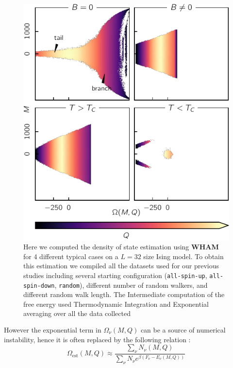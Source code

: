 \documentclass[ansiapaper]{report}
\begin{document}
\begin{multicols}{3}
\begin{figure}[H] 
    \begin{center}
        \hspace*{-.2cm}\includegraphics[width=1.05\linewidth]{figures/density_omega.pdf}
    \end{center}
    \caption{Here we computed the density of state estimation using \textbf{WHAM} for 4 different typical cases on a $L = 32$ size Ising model. To obtain this estimation we compiled all the datasets used for our previous studies including several starting configuration (\texttt{all-spin-up}, \texttt{all-spin-down}, \texttt{random}), different number of random walkers, and different random walk length. The Intermediate computation of the free energy used Thermodynamic Integration and Exponential averaging over all the data collected
    }
    \label{fig:density-states}
\end{figure}
However the exponential term in $\Omega_{\nu}(M,Q)$ can be a source of numerical instability, hence it is often replaced by the following relation : 
    \begin{equation*}
        \Omega_{\text{est}}(M,Q) \approx \frac{\sum_{\nu} N_{\nu}(M,Q)}
        {\sum_{\nu} N_{\nu} e^{\beta (F_{\nu}- E_{\nu}(M,Q))}}
        \label{eq:WHAM2}
    \end{equation*}


\end{multicols}
\end{document}
